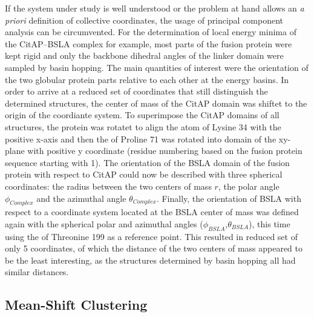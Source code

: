 \documentclass[english, a4paper, 12pt, titlepage, draft]{article}
\begin{document}
If the system under study is well understood or the problem at hand allows an \emph{a priori} definition of collective coordinates, the usage of principal component analysis can be circumvented.
For the determination of local energy minima of the CitAP--BSLA complex for example, most parts of the fusion protein were kept rigid and only the backbone dihedral angles of the linker domain were sampled by basin hopping.
The main quantities of interest were the orientation of the two globular protein parts relative to each other at the energy basins.
In order to arrive at a reduced set of coordinates that still distinguish the determined structures, the center of mass of the CitAP domain was shiftet to the origin of the coordiante system.
To superimpose the CitAP domains of all structures, the protein was rotatet to align the  atom of Lysine 34 with the positive x-axis and then the  of Proline 71 was rotated into domain of the xy-plane with positive y coordinate (residue numbering based on the fusion protein sequence starting with 1).
The orientation of the BSLA domain of the fusion protein with respect to CitAP could now be described with three spherical coordinates: the radius between the two centers of mass $r$, the polar angle $\phi_{Complex}$ and the azimuthal angle $\theta_{Complex}$.
Finally, the orientation of BSLA with respect to a coordinate system located at the BSLA center of mass was defined again with the spherical polar and azimuthal angles ($\phi_{BSLA}$,$\theta_{BSLA}$), this time using the  of Threonine 199 as a reference point.
This resulted in reduced set of only 5 coordinates, of which the distance of the two centers of mass appeared to be the least interesting, as the structures determined by basin hopping all had similar distances.




\subsection{Mean-Shift Clustering}
\end{document}
